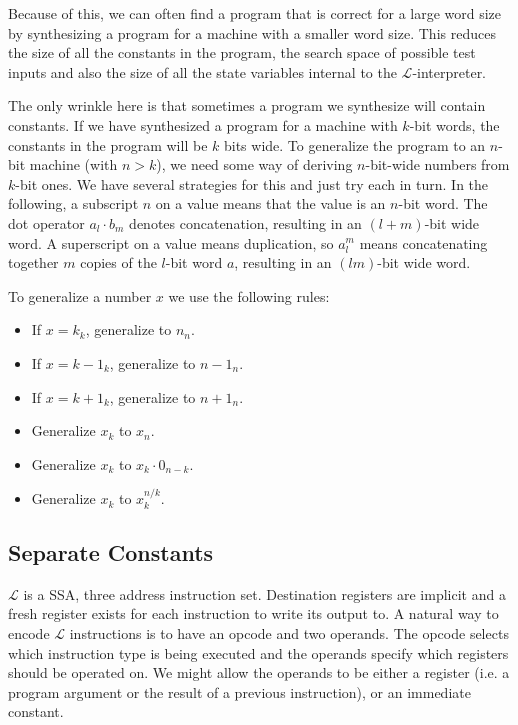 \documentclass[a4paper]{llncs}
\begin{document}
Because of this, we can often find a program that is correct for a large
word size by synthesizing a program for a machine with a smaller word size.
This reduces the size of all the constants in the program, the search space
of possible test inputs and also the size of all the state variables internal
to the $\mathcal{L}$-interpreter.

The only wrinkle here is that sometimes a program we synthesize will contain
constants.  If we have synthesized a program for a machine with $k$-bit words,
the constants in the program will be $k$ bits wide.  To generalize the program
to an $n$-bit machine (with $n > k$), we need some way of deriving $n$-bit-wide
numbers from $k$-bit ones.  We have several strategies for this and
just try each in turn.  In the following, a subscript $n$ on a value means that
the value is an $n$-bit word.  The dot operator $a_l \cdot b_m$ denotes
concatenation, resulting in an $(l+m)$-bit wide word.  A superscript on a value
means duplication, so $a_l^m$ means concatenating together $m$ copies of the $l$-bit
word $a$, resulting in an $(lm)$-bit wide word.

To generalize a number $x$ we use the following rules:

\begin{itemize}
 \item If $x = k_k$, generalize to $n_n$.
 \item If $x = k-1_k$, generalize to $n-1_n$.
 \item If $x = k+1_k$, generalize to $n+1_n$.
 \item Generalize $x_k$ to $x_n$.
 \item Generalize $x_k$ to $x_k \cdot 0_{n-k}$.
 \item Generalize $x_k$ to $x_k^{n / k}$.
\end{itemize}


\subsection{Separate Constants}

$\mathcal{L}$ is a SSA, three address instruction set.  Destination registers
are implicit and a fresh register exists for each instruction to write its
output to.  A natural way to encode $\mathcal{L}$ instructions is to have an
opcode and two operands.  The opcode selects which instruction type is being
executed and the operands specify which registers should be operated on.
We might allow the operands to be either a register (i.e. a program argument
or the result of a previous instruction), or an immediate constant.
\end{document}
